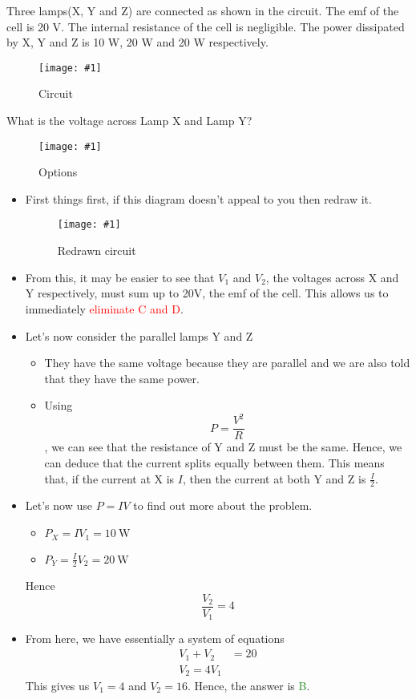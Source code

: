 \documentclass[a4paper,12pt]{article}
\newcommand{\img}[4]{\begin{center}
  \begin{figure}[H]
    \centering
    \texttt{[image: \#1]}
    \caption{#3}
    \label{fig:#4}
  \end{figure}
\end{center}}
\begin{document}
Three lamps(X, Y and Z) are connected as shown in the circuit. The emf of the cell is 20 V. The internal resistance of the cell is negligible. The power dissipated by X, Y and Z is 10 W, 20 W and 20 W respectively.

\img{ex/9.png}{0.4}{Circuit}{ex9}

What is the voltage across Lamp X and Lamp Y?

\img{ex/10.png}{0.5}{Options}{ex10}

\begin{itemize}
  \item First things first, if this diagram doesn't appeal to you then redraw it.
        \img{ex/11.png}{0.5}{Redrawn circuit}{ex11}
  \item From this, it may be easier to see that $V_1$ and $V_2$, the voltages across X and Y respectively, must sum up to 20V, the emf of the cell. This allows us to immediately \textcolor{red}{eliminate C and D}.
  \item Let's now consider the parallel lamps Y and Z
        \begin{itemize}
          \item They have the same voltage because they are parallel and we are also told that they have the same power.
          \item Using $$P = \frac{V^2}{R}$$, we can see that the resistance of Y and Z must be the same. Hence, we can deduce that the current splits equally between them. This means that, if the current at X is $I$, then the current at both Y and Z is $\frac{I}{2}$.
        \end{itemize}
  \item Let's now use $P = IV$ to find out more about the problem.
        \begin{itemize}
          \item $P_X = IV_1 = \SI{10}{\W}$
          \item $P_Y = \frac{I}{2}V_2 = \SI{20}{\W}$
        \end{itemize}
        Hence $$\frac{V_2}{V_1} = 4$$
  \item From here, we have essentially a system of equations
        \begin{align*}
          V_1 + V_2 & = 20 \\
          V_2 = 4V_1
        \end{align*}
        This gives us $V_1 = 4$ and $V_2 = 16$. Hence, the answer is \textcolor{ForestGreen}{B}.
\end{itemize}
\end{document}
